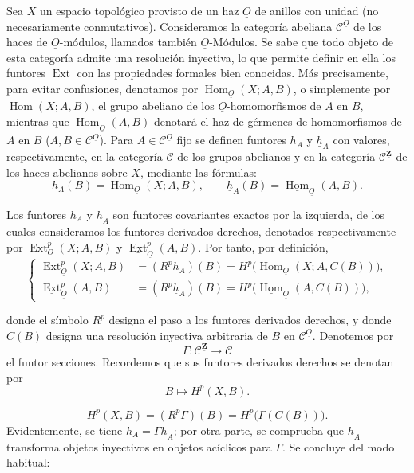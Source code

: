 \documentclass[11pt,twoside,openany]{book}
\numberwithin{equation}{section}
\newcommand{\src}[1]{%
  \phantomsection\hypertarget{src:#1}{}%
  \marginpar{\raggedleft\footnotesize\sffamily #1}%
}
\newcommand{\Osh}{\underline{O}}
\newcommand{\Zsh}{\underline{\mathbf Z}}
\newcommand{\Ccat}{\mathcal C}
\newcommand{\Homsh}{\underline{\operatorname{Hom}}}
\newcommand{\Extsh}{\underline{\operatorname{Ext}}}
\newcommand{\hsh}{\underline{h}}
\newcommand{\fquote}[1]{\textquotedbl#1\textquotedbl}
\theoremstyle{plain}
\theoremstyle{definition}
\theoremstyle{remark}
\newcommand{\FgaUnitKey}{frontmatter}
\renewcommand{\src}[1]{%
  \phantomsection\hypertarget{src:\FgaUnitKey:#1}{}%
  \marginpar{\raggedleft\footnotesize\sffamily #1}%
}
\theoremstyle{plain}
\theoremstyle{definition}
\theoremstyle{remark}
\begin{document}
Sea $X$ un espacio topológico provisto de un haz $\Osh$ de anillos con unidad
(no necesariamente conmutativos). Consideramos la categoría abeliana
$\Ccat^{\Osh}$ de los haces de $\Osh$-módulos, llamados también $\Osh$-Módulos.
Se sabe que todo objeto de esta categoría admite una resolución inyectiva, lo que
permite definir en ella los funtores $\operatorname{Ext}$ con las propiedades
formales bien conocidas. Más precisamente, para evitar confusiones,
denotamos por $\operatorname{Hom}_{\Osh}(X;A,B)$, o simplemente por
$\operatorname{Hom}(X;A,B)$, el grupo abeliano de los $\Osh$-homomorfismos de $A$
en $B$, mientras que $\Homsh_{\Osh}(A,B)$ denotará el haz de gérmenes
de homomorfismos de $A$ en $B$ ($A,B\in\Ccat^{\Osh}$). Para
$A\in\Ccat^{\Osh}$ fijo se definen funtores $h_A$ y $\hsh_A$ con valores, respectivamente,
en la categoría $\Ccat$ de los grupos abelianos y en la categoría
$\Ccat^{\Zsh}$ de los haces abelianos sobre $X$, mediante las fórmulas:
\begin{equation}\tag{1.1}
  h_A(B)=\operatorname{Hom}_{\Osh}(X;A,B),
  \qquad
  \hsh_A(B)=\Homsh_{\Osh}(A,B).
\end{equation}

Los funtores $h_A$ y $\hsh_A$ son funtores covariantes exactos por la izquierda,
de los cuales consideramos los funtores derivados derechos, denotados respectivamente por
$\operatorname{Ext}_{\Osh}^{p}(X;A,B)$ y $\Extsh_{\Osh}^{p}(A,B)$. Por tanto,
por definición,
\begin{equation}\tag{1.2}
\left\{
\begin{aligned}
\operatorname{Ext}_{\Osh}^{p}(X;A,B)
  &= (R^{p}h_A)(B)
   = H^{p}\bigl(\operatorname{Hom}_{\Osh}(X;A,C(B))\bigr),\\
\Extsh_{\Osh}^{p}(A,B)
  &= (R^{p}\hsh_A)(B)
   = H^{p}\bigl(\Homsh_{\Osh}(A,C(B))\bigr),
\end{aligned}
\right.
\end{equation}

donde el símbolo $R^{p}$ designa el paso a los funtores derivados derechos, y donde
$C(B)$ designa una resolución inyectiva arbitraria de $B$ en $\Ccat^{\Osh}$.
Denotemos por
\[
  \Gamma:\Ccat^{\Zsh}\longrightarrow\Ccat
\]
el funtor \fquote{secciones}. Recordemos que sus funtores derivados derechos se
denotan por
\[
  B\longmapsto H^{p}(X,B).
\]

\src{170}
\begin{equation}\tag{1.3}
  H^{p}(X,B)=(R^{p}\Gamma)(B)=H^{p}\bigl(\Gamma(C(B))\bigr).
\end{equation}
Evidentemente, se tiene $h_A=\Gamma\hsh_A$; por otra parte, se comprueba que $\hsh_A$
transforma objetos inyectivos en objetos acíclicos para $\Gamma$. Se concluye del
modo habitual:
\end{document}
